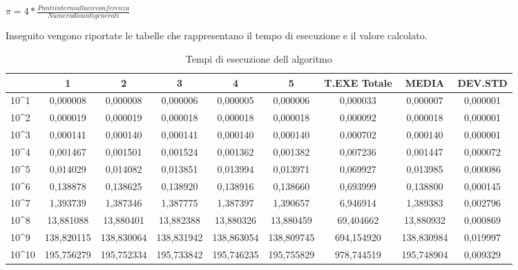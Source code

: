 \documentclass[12pt,a4paper]{report}
\begin{document}
\vspace{1cm}
$ \pi = 4 * \frac{Punti interni alla circonferenza}{Numero di ounti generati} $ 

	

Inseguito vengono riportate le tabelle che rappresentano il tempo di esecuzione e il valore calcolato.

\begin{table}[h]
\begin{tabular}{| l | c | c | c | c | c | c | c  | c |}
\hline
             & 1          & 2          & 3          & 4          & 5          & T.EXE Totale & MEDIA      & DEV.STD  \\ \hline
10\textasciicircum{}1  & 0,000008   & 0,000008   & 0,000006   & 0,000005   & 0,000006   & 0,000033     & 0,000007   & 0,000001 \\ \hline
10\textasciicircum{}2  & 0,000019   & 0,000019   & 0,000018   & 0,000018   & 0,000018   & 0,000092     & 0,000018   & 0,000001 \\ \hline
10\textasciicircum{}3  & 0,000141   & 0,000140   & 0,000141   & 0,000140   & 0,000140   & 0,000702     & 0,000140   & 0,000001 \\ \hline
10\textasciicircum{}4  & 0,001467   & 0,001501   & 0,001524   & 0,001362   & 0,001382   & 0,007236     & 0,001447   & 0,000072 \\ \hline
10\textasciicircum{}5  & 0,014029   & 0,014082   & 0,013851   & 0,013994   & 0,013971   & 0,069927     & 0,013985   & 0,000086 \\ \hline
10\textasciicircum{}6  & 0,138878   & 0,138625   & 0,138920   & 0,138916   & 0,138660   & 0,693999     & 0,138800   & 0,000145 \\ \hline
10\textasciicircum{}7  & 1,393739   & 1,387346   & 1,387775   & 1,387397   & 1,390657   & 6,946914     & 1,389383   & 0,002796 \\ \hline
10\textasciicircum{}8  & 13,881088  & 13,880401  & 13,882388  & 13,880326  & 13,880459  & 69,404662    & 13,880932  & 0,000869 \\ \hline
10\textasciicircum{}9  & 138,820115 & 138,830064 & 138,831942 & 138,863054 & 138,809745 & 694,154920   & 138,830984 & 0,019997 \\ \hline
10\textasciicircum{}10 & 195,756279 & 195,752334 & 195,733842 & 195,746235 & 195,755829 & 978,744519   & 195,748904 & 0,009329 \\ \hline
\end{tabular}
\caption{Tempi di esecuzione dell algoritmo}
\label{Tab:TimeExceMCPi}
\end{table}
\end{document}
